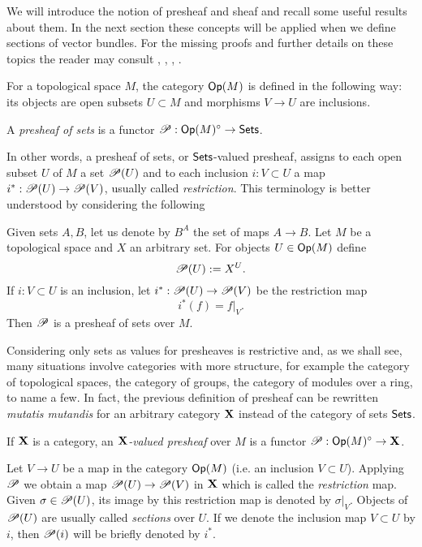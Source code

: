We will introduce the notion of presheaf and sheaf and recall some useful results about them. In the next section these concepts will be applied when we define sections of vector bundles. For the missing proofs and further details on these topics the reader may consult \cite{tennison:_sheaf}, \cite{kn:kscha}, \cite{kn:warner}, \cite{kn:gortz_wed}.

For a topological space $M$, the category $\mathsf{Op}(M)$ is defined in the following way: its objects are open subsets $U\subset M$ and morphisms $V\to U$ are inclusions.

\begin{defi}
A \emph{presheaf of sets} is a functor $\mathscr{P}:\mathsf{Op}(M)^{\circ}\to \mathsf{Sets}$.
\end{defi}

In other words, a presheaf of sets, or $\mathsf{Sets}$-valued presheaf, assigns to each open subset $U$ of $M$ a set $\mathscr{P}(U)$ and to each inclusion $i:V\subset U$ a map $i^*:\mathscr{P}(U)\to \mathscr{P}(V)$, usually called \emph{restriction}. This terminology is better understood by considering the following

\begin{ej}
Given sets $A,B$, let us denote by $B^A$ the set of maps $A\to B$. Let $M$ be a topological space and $X$ an arbitrary set. For objects $U\in \mathsf{Op}(M)$ define
$$\mathscr{P}(U):=X^U.$$
If $i:V\subset U$ is an inclusion, let $i^*:\mathscr{P}(U)\to \mathscr{P}(V)$ be the restriction map
$$i^*(f)=f|_V.$$
Then $\mathscr{P}$ is a presheaf of sets over $M$.
\end{ej}

Considering only sets as values for presheaves is restrictive and, as we shall see, many situations involve categories with more structure, for example the category of topological spaces, the category of groups, the category of modules over a ring, to name a few. In fact, the previous definition of presheaf can be rewritten \emph{mutatis mutandis} for an arbitrary category ${\bf X}$ instead of the category of sets $\mathsf{Sets}$.

\begin{defi}
If ${\bf X}$ is a category, an \emph{${\bf X}$-valued presheaf} over $M$ is a functor $\mathscr{P}:\mathsf{Op}(M)^{\circ}\to {\bf X}$.
\end{defi}

Let $V\to U$ be a map in the category $\mathsf{Op}(M)$ (i.e. an inclusion $V\subset U$). Applying $\mathscr{P}$ we obtain a map $\mathscr{P}(U)\to \mathscr{P}(V)$ in ${\bf X}$ which is called the \emph{restriction} map. Given $\sigma \in \mathscr{P}(U)$, its image by this restriction map is denoted by $\sigma |_V$. Objects of $\mathscr{P}(U)$ are usually called \emph{sections} over $U$. If we denote the inclusion map $V\subset U$ by $i$, then $\mathscr{P}(i)$ will be briefly denoted by $i^*$.


